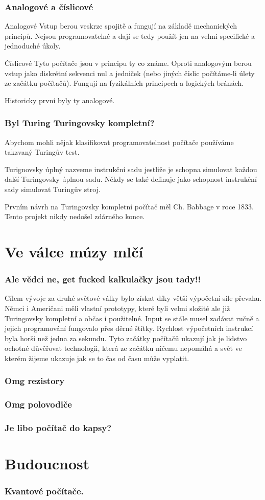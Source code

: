 \documentclass{beamer}
\begin{document}
\begin{frame}
 \frametitle{Analogové a číslicové}
 \begin{block}{Analogové}
  Vstup berou veskrze spojitě a fungují na základě mechanických principů. Nejsou
  programovatelné a dají se tedy použít jen na velmi specifické a jednoduché
  úkoly.
 \end{block}

 \begin{block}{Číslicové}
  Tyto počítače jsou v principu ty co známe. Oproti analogovým berou vstup jako
  diskrétní sekvenci nul a jedniček (nebo jiných číslic počítáme-li úlety ze
  začátku počítačů). Fungují na fyzikálních principech a logických bránách.
  
 \end{block}

Historicky první byly ty analogové.
 \end{frame}

\begin{frame}
\frametitle{Byl Turing Turingovsky kompletní?}
Abychom mohli nějak klasifikovat programovatelnost počítače používáme takzvaný
Turingův test.
\begin{block}{Turignovsky úplný}
nazveme instrukční sadu jestliže je schopna simulovat každou další Turingovsky
úplnou sadu. Někdy se také definuje jako schopnost instrukční sady simulovat
Turingův stroj. 
\end{block}
Prvním návrh na Turingovsky kompletní počítač měl Ch. Babbage v roce 1833. Tento
projekt nikdy nedošel zdárného konce.
\end{frame}

\section{Ve válce múzy mlčí}
\begin{frame}
 \frametitle{Ale vědci ne, get fucked kalkulačky jsou tady!!}
Cílem vývoje za druhé světové války bylo získat díky větší výpočetní síle
převahu. Němci i Američani měli vlastní prototypy, které byli velmi složité ale
již Turingovsky kompletní a občas i použitelné.
\vfill
Input se stále musel zadávat ručně a jejich programování fungovalo přes děrné
štítky. Rychlost výpočetních instrukcí byla horší než jedna za sekundu.
\vfill
Tyto začátky počítačů ukazují jak je lidstvo ochotné důvěřovat technologii,
která ze začátku ničemu nepomáhá a svět ve kterém žijeme ukazuje jak se to čas
od času může vyplatit.
\end{frame}

\begin{frame}
 \frametitle{Omg rezistory}
\end{frame}
\begin{frame}
 \frametitle{Omg polovodiče}
\end{frame}
\begin{frame}
 \frametitle{Je libo počítač do kapsy?}
\end{frame}

\section{Budoucnost}
\begin{frame}
 \frametitle{Kvantové počítače.}
\end{frame}
\end{document}
